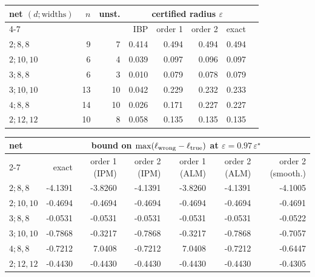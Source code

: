 \begin{tabular}{l r r r r r r r}\toprule
net $(d;\text{widths})$ & $n$ & unst. & \multicolumn{4}{c}{certified radius $\varepsilon$} \\\cmidrule(lr){4-7}
 & & & IBP & order 1 & order 2 & exact \\\midrule
$2;8{,}8$ & 9 & 7 & 0.414 & 0.494 & 0.494 & 0.494 \\
$2;10{,}10$ & 6 & 4 & 0.039 & 0.097 & 0.096 & 0.097 \\
$3;8{,}8$ & 6 & 3 & 0.010 & 0.079 & 0.078 & 0.079 \\
$3;10{,}10$ & 13 & 10 & 0.042 & 0.229 & 0.232 & 0.233 \\
$4;8{,}8$ & 14 & 10 & 0.026 & 0.171 & 0.227 & 0.227 \\
$2;12{,}12$ & 10 & 8 & 0.058 & 0.135 & 0.135 & 0.135 \\
\bottomrule\end{tabular}\par\medskip
\begin{tabular}{l r r r r r r}\toprule
net & \multicolumn{6}{c}{bound on $\max(\ell_{\rm wrong}-\ell_{\rm true})$ at $\varepsilon=0.97\,\varepsilon^\star$} \\\cmidrule(lr){2-7}
 & exact & order 1 (IPM) & order 2 (IPM) & order 1 (ALM) & order 2 (ALM) & order 2 (smooth.) \\\midrule
$2;8{,}8$ & -4.1391 & -3.8260 & -4.1391 & -3.8260 & -4.1391 & -4.1005 \\
$2;10{,}10$ & -0.4694 & -0.4694 & -0.4694 & -0.4694 & -0.4694 & -0.4691 \\
$3;8{,}8$ & -0.0531 & -0.0531 & -0.0531 & -0.0531 & -0.0531 & -0.0522 \\
$3;10{,}10$ & -0.7868 & -0.3217 & -0.7868 & -0.3217 & -0.7868 & -0.7057 \\
$4;8{,}8$ & -0.7212 & 7.0408 & -0.7212 & 7.0408 & -0.7212 & -0.6447 \\
$2;12{,}12$ & -0.4430 & -0.4430 & -0.4430 & -0.4430 & -0.4430 & -0.4305 \\
\bottomrule\end{tabular}
